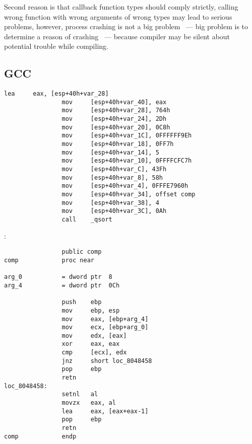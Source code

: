 {Second reason is that callback function types should comply strictly, calling wrong function
with wrong arguments of wrong types may lead to serious problems, however, process crashing is not a 
big problem ~--- big problem is to determine a reason of crashing ~--- because compiler may be 
silent about potential trouble while compiling.}

\subsection{GCC}


\begin{lstlisting}[caption=GCC]
                lea     eax, [esp+40h+var_28]
                mov     [esp+40h+var_40], eax
                mov     [esp+40h+var_28], 764h
                mov     [esp+40h+var_24], 2Dh
                mov     [esp+40h+var_20], 0C8h
                mov     [esp+40h+var_1C], 0FFFFFF9Eh
                mov     [esp+40h+var_18], 0FF7h
                mov     [esp+40h+var_14], 5
                mov     [esp+40h+var_10], 0FFFFCFC7h
                mov     [esp+40h+var_C], 43Fh
                mov     [esp+40h+var_8], 58h
                mov     [esp+40h+var_4], 0FFFE7960h
                mov     [esp+40h+var_34], offset comp
                mov     [esp+40h+var_38], 4
                mov     [esp+40h+var_3C], 0Ah
                call    _qsort
\end{lstlisting}

:

\begin{lstlisting}
                public comp
comp            proc near

arg_0           = dword ptr  8
arg_4           = dword ptr  0Ch

                push    ebp
                mov     ebp, esp
                mov     eax, [ebp+arg_4]
                mov     ecx, [ebp+arg_0]
                mov     edx, [eax]
                xor     eax, eax
                cmp     [ecx], edx
                jnz     short loc_8048458
                pop     ebp
                retn
loc_8048458:
                setnl   al
                movzx   eax, al
                lea     eax, [eax+eax-1]
                pop     ebp
                retn
comp            endp
\end{lstlisting}

